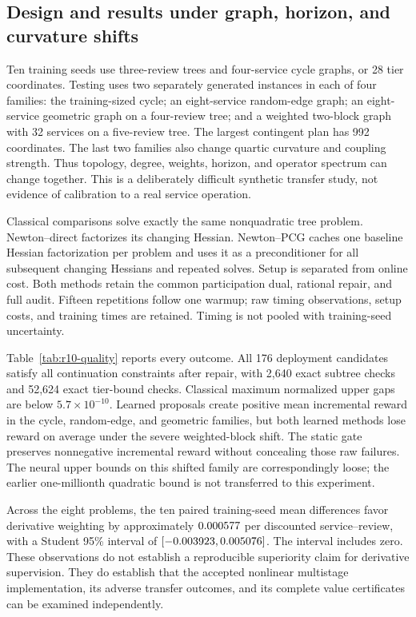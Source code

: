 \subsection{Design and results under graph, horizon, and curvature shifts}
Ten training seeds use three-review trees and four-service cycle graphs, or 28 tier coordinates. Testing uses two separately generated instances in each of four families: the training-sized cycle; an eight-service random-edge graph; an eight-service geometric graph on a four-review tree; and a weighted two-block graph with 32 services on a five-review tree. The largest contingent plan has 992 coordinates. The last two families also change quartic curvature and coupling strength. Thus topology, degree, weights, horizon, and operator spectrum can change together. This is a deliberately difficult synthetic transfer study, not evidence of calibration to a real service operation.

Classical comparisons solve exactly the same nonquadratic tree problem. Newton--direct factorizes its changing Hessian. Newton--PCG caches one baseline Hessian factorization per problem and uses it as a preconditioner for all subsequent changing Hessians and repeated solves. Setup is separated from online cost. Both methods retain the common participation dual, rational repair, and full audit. Fifteen repetitions follow one warmup; raw timing observations, setup costs, and training times are retained. Timing is not pooled with training-seed uncertainty.

Table~\ref{tab:r10-quality} reports every outcome. All 176 deployment candidates satisfy all continuation constraints after repair, with 2,640 exact subtree checks and 52,624 exact tier-bound checks. Classical maximum normalized upper gaps are below $5.7\times10^{-10}$. Learned proposals create positive mean incremental reward in the cycle, random-edge, and geometric families, but both learned methods lose reward on average under the severe weighted-block shift. The static gate preserves nonnegative incremental reward without concealing those raw failures. The neural upper bounds on this shifted family are correspondingly loose; the earlier one-millionth quadratic bound is not transferred to this experiment.

Across the eight problems, the ten paired training-seed mean differences favor derivative weighting by approximately $0.000577$ per discounted service--review, with a Student 95\% interval of $[-0.003923,0.005076]$. The interval includes zero. These observations do not establish a reproducible superiority claim for derivative supervision. They do establish that the accepted nonlinear multistage implementation, its adverse transfer outcomes, and its complete value certificates can be examined independently.

